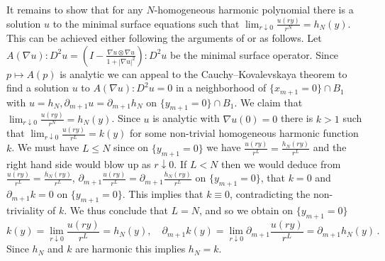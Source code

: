 \documentclass[reqno]{amsart}
\theoremstyle{definition}
\theoremstyle{remark}
\numberwithin{equation}{section}
\begin{document}
It remains to show that for any $N$-homogeneous harmonic polynomial there is a solution $u$ to the minimal surface equations such that $\lim_{r\downarrow 0} \frac{u(ry)}{r^N}=h_N(y)$. This can be achieved either following the arguments of \cite[Theorem 1.1, Corollary 1.2]{CaffarelliHardtSimon1984} or as follows. Let $A(\nabla u)\colon D^2u= \left(I - \frac{\nabla u \otimes \nabla u}{1+|\nabla u|^2}\right) \colon D^2u$ be the minimal surface operator. Since $p \mapsto A(p)$ is analytic we can appeal to the Cauchy–Kovalevskaya theorem to find a solution $u$ to $A(\nabla u)\colon D^2u=0$ in a neighborhood of $\{x_{m+1}=0\}\cap B_1$ with $u=h_N, \partial_{m+1}u=\partial_{m+1}h_N$ on $\{y_{m+1}=0\}\cap B_1$. We claim that $\lim_{r\downarrow 0} \frac{u(ry)}{r^N}=h_N(y)$. Since $u$ is analytic with $\nabla u(0)=0$ there is $k>1$ such that $\lim_{r\downarrow 0} \frac{u(ry)}{r^L} = k(y)$ for some non-trivial homogeneous harmonic function $k$. We must have $L\le N$ since on $\{y_{m+1}=0\}$ we have $\frac{u(ry)}{r^L}=\frac{h_N(ry)}{r^L}$ and the right hand side would blow up as $r\downarrow 0$. If $L <N$ then we would deduce from  $\frac{u(ry)}{r^L}=\frac{h_N(ry)}{r^L}$, $\partial_{m+1}\frac{u(ry)}{r^L}=\partial_{m+1}\frac{h_N(ry)}{r^L}$ on $\{y_{m+1}=0\}$, that $k=0$ and $\partial_{m+1} k=0$ on $\{y_{m+1}=0\}$. This implies that $k \equiv 0$, contradicting the non-triviality of $k$. We thus conclude that $L=N$, and so we obtain on $\{y_{m+1}=0\}$
\[ k(y) = \lim_{r\downarrow 0} \frac{u(ry)}{r^L}=h_N(y),\quad \partial_{m+1}k(y) = \lim_{r\downarrow 0} \partial_{m+1}\frac{u(ry)}{r^L}=\partial_{m+1}h_N(y)\,.\]
Since $h_N$ and $k$ are harmonic this implies $h_N=k$. 
\end{document}
